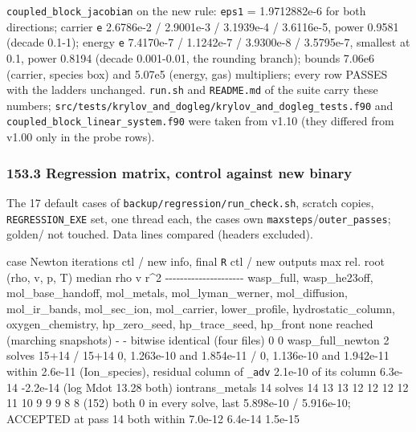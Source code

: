\documentclass[english,a4paper]{my_memo}
\begin{document}
\texttt{coupled\_block\_jacobian} on the new rule: \texttt{eps1} = 1.9712882e-6 for both directions; carrier \texttt{e} 2.6786e-2 / 2.9001e-3 / 3.1939e-4 / 3.6116e-5, power 0.9581 (decade 0.1-1); energy \texttt{e} 7.4170e-7 / 1.1242e-7 / 3.9300e-8 / 3.5795e-7, smallest at 0.1, power 0.8194 (decade 0.001-0.01, the rounding branch); bounds 7.06e6 (carrier, species box) and 5.07e5 (energy, gas) multipliers; every row PASSES with the ladders unchanged. \texttt{run.sh} and \texttt{README.md} of the suite carry these numbers; \texttt{src/tests/krylov\_and\_dogleg/krylov\_and\_dogleg\_tests.f90} and \texttt{coupled\_block\_linear\_system.f90} were taken from v1.10 (they differed from v1.00 only in the probe rows).

\subsubsection{153.3 Regression matrix, control against new binary}\label{1533-regression-matrix-control-against-new-binary}

The 17 default cases of \texttt{backup/regression/run\_check.sh}, scratch copies, \texttt{REGRESSION\_EXE} set, one thread each, the cases\textquotesingle{} own \texttt{maxsteps}/\texttt{outer\_passes}; golden/ not touched. Data lines compared (headers excluded).

\textbar{} case \textbar{} Newton \textbar{} iterations ctl / new \textbar{} info, final \texttt{\textbar{}\textbar{}R\textbar{}\textbar{}} ctl / new \textbar{} outputs \textbar{} max rel. root (rho, v, p, T) \textbar{} median rho v r\^{}2 \textbar{}
\textbar-\/-\/-\textbar-\/-\/-\textbar-\/-\/-\textbar-\/-\/-\textbar-\/-\/-\textbar-\/-\/-\textbar-\/-\/-\textbar{}
\textbar{} wasp\_full, wasp\_he23off, mol\_base\_handoff, mol\_metals, mol\_lyman\_werner, mol\_diffusion, mol\_ir\_bands, mol\_sec\_ion, mol\_carrier, lower\_profile, hydrostatic\_column, oxygen\_chemistry, hp\_zero\_seed, hp\_trace\_seed, hp\_front \textbar{} none reached (marching snapshots) \textbar{} - \textbar{} - \textbar{} bitwise identical (four files) \textbar{} 0 \textbar{} 0 \textbar{}
\textbar{} wasp\_full\_newton \textbar{} 2 solves \textbar{} 15+14 / 15+14 \textbar{} 0, 1.263e-10 and 1.854e-11 / 0, 1.136e-10 and 1.942e-11 \textbar{} within 2.6e-11 (Ion\_species), residual column of \texttt{\_adv} 2.1e-10 of its column \textbar{} 6.3e-14 \textbar{} -2.2e-14 (log Mdot 13.28 both) \textbar{}
\textbar{} iontrans\_metals \textbar{} 14 solves \textbar{} 14 13 13 12 12 12 12 11 10 9 9 9 8 8 (152) both \textbar{} 0 in every solve, last 5.898e-10 / 5.916e-10; ACCEPTED at pass 14 both \textbar{} within 7.0e-12 \textbar{} 6.4e-14 \textbar{} 1.5e-15 \textbar{}
\end{document}
